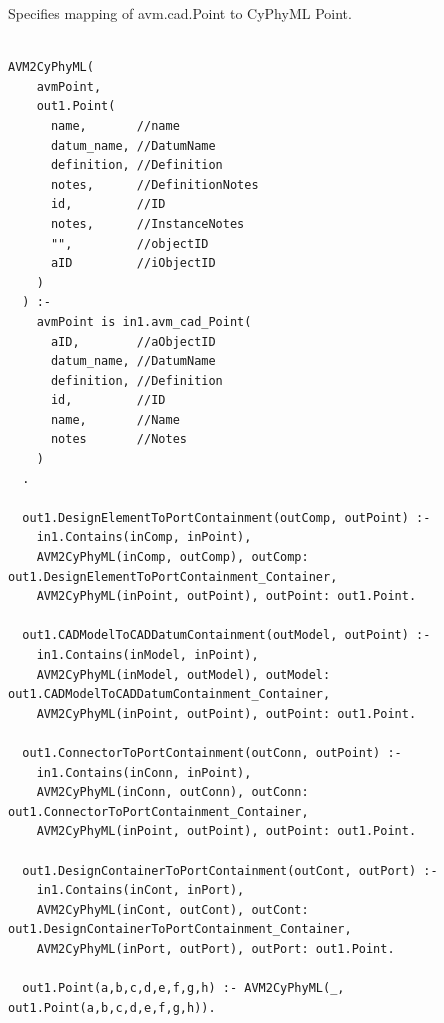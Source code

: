 Specifies mapping of avm.cad.Point to CyPhyML Point.
\begin{lstlisting}

AVM2CyPhyML(
    avmPoint,
    out1.Point(
      name,       //name
      datum_name, //DatumName
      definition, //Definition
      notes,      //DefinitionNotes
      id,         //ID
      notes,      //InstanceNotes
      "",         //objectID
      aID         //iObjectID
    )
  ) :-
    avmPoint is in1.avm_cad_Point(
      aID,        //aObjectID
      datum_name, //DatumName
      definition, //Definition
      id,         //ID
      name,       //Name
      notes       //Notes
    )
  .

  out1.DesignElementToPortContainment(outComp, outPoint) :-
    in1.Contains(inComp, inPoint),
    AVM2CyPhyML(inComp, outComp), outComp: out1.DesignElementToPortContainment_Container,
    AVM2CyPhyML(inPoint, outPoint), outPoint: out1.Point.

  out1.CADModelToCADDatumContainment(outModel, outPoint) :-
    in1.Contains(inModel, inPoint),
    AVM2CyPhyML(inModel, outModel), outModel: out1.CADModelToCADDatumContainment_Container,
    AVM2CyPhyML(inPoint, outPoint), outPoint: out1.Point.

  out1.ConnectorToPortContainment(outConn, outPoint) :-
    in1.Contains(inConn, inPoint),
    AVM2CyPhyML(inConn, outConn), outConn: out1.ConnectorToPortContainment_Container,
    AVM2CyPhyML(inPoint, outPoint), outPoint: out1.Point.

  out1.DesignContainerToPortContainment(outCont, outPort) :-
    in1.Contains(inCont, inPort),
    AVM2CyPhyML(inCont, outCont), outCont: out1.DesignContainerToPortContainment_Container,
    AVM2CyPhyML(inPort, outPort), outPort: out1.Point.

  out1.Point(a,b,c,d,e,f,g,h) :- AVM2CyPhyML(_, out1.Point(a,b,c,d,e,f,g,h)).


\end{lstlisting}

